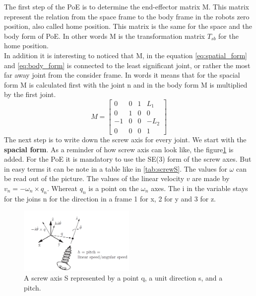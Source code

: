 The first step of the PoE is to determine the end-effector matrix M. This matrix represent the relation from the space frame to the body frame in the robots zero position, also called home position. This matrix is the same for the space and the body form of PoE. In other words M is the transformation matrix $T_{sb}$ for the home position. \\
In addition it is interesting to noticed that M, in the equation \ref{eq:spatial_form} and \ref{eq:body_form} is connected to the least significant joint, or rather the most far away joint from the consider frame. In words it means that for the spacial form M is calculated first with the joint n and in the body form M is multiplied by the first joint. 
\begin{equation}
    M = 
    \begin{bmatrix}
        0 & 0 & 1 & L_1\\
        0 & 1 & 0 & 0 \\
        -1 & 0 & 0 &-L_2\\
        0 & 0 & 0 & 1
    \end{bmatrix}
\end{equation}
The next step is to write down the screw axis for every joint. We start with the \textbf{spacial form}. As a reminder of how screw axis can look like, the figure\ref{fig:screw_axis} is added.  For the PoE it is mandatory to use the SE(3) form of the screw axes. But in easy terms it can be note in a table like in \ref{tab:screwS}. The values for $\omega$ can be read out of the picture. The values of  the linear velocity $v$ are made by $v_n =  -\omega_n \times q_n$. Whereat $q_n$ is a point on the $\omega_n$ axes. The i in the variable stays for the joins n for the direction in a frame 1 for x, 2 for y and 3 for z. 
\begin{figure}[H]
    \centering
    \includegraphics[width=0.5\textwidth]{Images/Task1.3/scew_axis.PNG}
    \caption[screw axis]{A screw axis S represented by a point q, a unit direction s, and a pitch.}
    \label{fig:screw_axis}
\end{figure}

